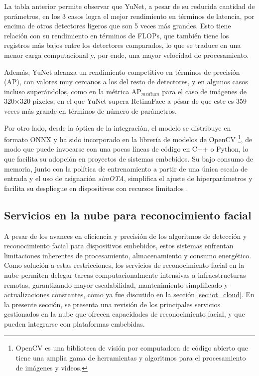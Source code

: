 La tabla anterior permite observar que YuNet, a pesar de su reducida cantidad de parámetros, en los 3 casos logra el mejor rendimiento en términos de latencia, por encima de otros detectores ligeros que son 5 veces más grandes. Esto tiene relación con su rendimiento en términos de FLOPs, que también tiene los registros más bajos entre los detectores comparados, lo que se traduce en una menor carga computacional y, por ende, una mayor velocidad de procesamiento.

Además, YuNet alcanza un rendimiento competitivo en términos de precisión (AP), con valores muy cercanos a los del resto de detectores, y en algunos casos incluso superándolos, como en la métrica AP$_{medium}$ para el caso de imágenes de 320$\times$320 píxeles, en el que YuNet supera RetinaFace a pésar de que este es 359 veces más grande en términos de número de parámetros.

Por otro lado, desde la óptica de la integración, el modelo se distribuye en formato ONNX y ha sido incorporado en la librería de modelos de OpenCV \footnote{OpenCV es una biblioteca de visión por computadora de código abierto que tiene una amplia gama de herramientas y algoritmos para el procesamiento de imágenes y videos.}, de modo que puede invocarse con una pocas líneas de código en C++ o Python, lo que facilita su adopción en proyectos de sistemas embebidos. Su bajo consumo de memoria, junto con la política de entrenamiento a partir de una única escala de entrada y el uso de asignación \textit{simOTA}, simplifica el ajuste de hiperparámetros y facilita su despliegue en dispositivos con recursos limitados \cite{wu_yunet_2023}.

\subsection{Servicios en la nube para reconocimiento facial}

A pesar de los avances en eficiencia y precisión de los algoritmos de detección y reconocimiento facial para dispositivos embebidos, estos sistemas enfrentan limitaciones inherentes de procesamiento, almacenamiento y consumo energético. Como solución a estas restricciones, los servicios de reconocimiento facial en la nube permiten delegar tareas computacionalmente intensivas a infraestructuras remotas, garantizando mayor escalabilidad, mantenimiento simplificado y actualizaciones constantes, como ya fue discutido en la sección \ref{sec:iot_cloud}. En la presente sección, se presenta una revisión de los principales servicios gestionados en la nube que ofrecen capacidades de reconocimiento facial, y que pueden integrarse con plataformas embebidas.

